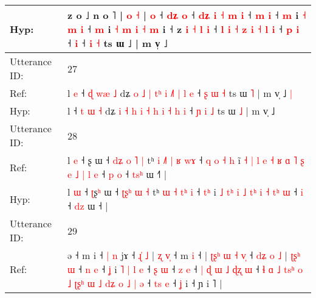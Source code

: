 \documentclass[10pt]{article}
\DeclareRobustCommand{\hl}[1]{{\textcolor{red}{#1}}}
\begin{document}
\begin{longtable}{ll}
Hyp: & z o ˩ n\hl{}\hl{}\hl{}\hl{}\hl{}\hl{}\hl{} o ˥ |\hl{}\hl{}\hl{} \hl{o} \hl{}\hl{˧} | \hl{o} ˧ \hl{d}\hl{ʑ} \hl{o} ˧ \hl{}\hl{d}\hl{ʑ} \hl{i} \hl{˧} \hl{}\hl{}\hl{m} \hl{i} ˧ \hl{m} \hl{i} ˧ \hl{m} i \hl{˧} \hl{m} \hl{}\hl{i} ˧ \hl{m} i\hl{}\hl{} \hl{˧} \hl{m} \hl{i} \hl{˧} \hl{m} i ˧ z\hl{}\hl{} \hl{i} \hl{˧} \hl{}\hl{}\hl{l} \hl{i} ˧ \hl{}\hl{l} \hl{i} \hl{}\hl{˧} \hl{z} \hl{i} \hl{˧} \hl{l} \hl{i} ˧ \hl{p} \hl{i} ˧\hl{}\hl{}\hl{}\hl{}\hl{} \hl{i} ˧\hl{}\hl{} \hl{}\hl{i} \hl{˧} ts ɯ ˩ | m v̩ ˩
 \\
\midrule
Utterance ID: & 27 \\
Ref: & l\hl{ }\hl{e} ˧ \hl{ɖ} \hl{w}\hl{æ} \hl{˩} dʑ \hl{o} \hl{˩} \hl{|} \hl{t}\hl{ʰ} \hl{i} \hl{}\hl{˩}\hl{˥} \hl{|} \hl{l} \hl{e} ˧ \hl{ʂ} \hl{ɯ} \hl{˧} ts ɯ \hl{˥} | m v̩ ˩\hl{ }\hl{|}
 \\
Hyp: & l\hl{}\hl{} ˧ \hl{t} \hl{}\hl{ɯ} \hl{˧} dʑ \hl{i} \hl{˧} \hl{h} \hl{}\hl{i} \hl{˧} \hl{h}\hl{ }\hl{i} \hl{˧} \hl{h} \hl{i} ˧ \hl{ɲ} \hl{i} \hl{˩} ts ɯ \hl{˩} | m v̩ ˩\hl{}\hl{}
 \\
\midrule
Utterance ID: & 28 \\
Ref: & l \hl{e} ˧ \hl{}ʂ\hl{} ɯ ˧ \hl{d}\hl{ʑ}\hl{ }\hl{o} \hl{˥} \hl{|} tʰ \hl{i} \hl{˩}\hl{˥} \hl{|}\hl{ }\hl{ʁ} \hl{w}\hl{ɤ} ˧\hl{ }\hl{q}\hl{ }\hl{o} \hl{˧}\hl{ }\hl{h} i\hl{̃}\hl{ }\hl{˧}\hl{ }\hl{|} \hl{l} \hl{e}\hl{ }\hl{˧} \hl{ʁ} \hl{ɑ} \hl{˥}\hl{ }\hl{ʂ} \hl{e} \hl{˩} \hl{|}\hl{ }\hl{l} \hl{e} ˧\hl{ }\hl{p} \hl{o} ˧ \hl{t}\hl{s}\hl{ʰ} ɯ ˧\hl{˥} |
 \\
Hyp: & l \hl{ɯ} ˧ \hl{ʈ}ʂ\hl{ʰ} ɯ ˧ \hl{}\hl{ʈ}\hl{ʂ}\hl{ʰ} \hl{ɯ} \hl{˧} tʰ \hl{ɯ} \hl{}\hl{˧} \hl{}\hl{t}\hl{ʰ} \hl{}\hl{i} ˧\hl{}\hl{}\hl{}\hl{} \hl{}\hl{t}\hl{ʰ} i\hl{}\hl{}\hl{}\hl{}\hl{} \hl{˩} \hl{}\hl{t}\hl{ʰ} \hl{i} \hl{˩} \hl{}\hl{t}\hl{ʰ} \hl{i} \hl{˧} \hl{}\hl{t}\hl{ʰ} \hl{ɯ} ˧\hl{}\hl{} \hl{i} ˧ \hl{}\hl{d}\hl{z} ɯ ˧\hl{} |
 \\
\midrule
Utterance ID: & 29 \\
Ref: & ə ˧ m i ˧\hl{ }\hl{|} \hl{n} jɤ ˧\hl{ }\hl{ɻ}\hl{̍}\hl{ }\hl{˩} |\hl{ }\hl{ʐ} \hl{v}\hl{̩} ˧ m \hl{i} ˧ |\hl{ }\hl{ʈ}\hl{ʂ}\hl{ʰ}\hl{ }\hl{ɯ}\hl{ }\hl{˧} \hl{v}\hl{̩} ˧\hl{ }\hl{d}\hl{ʑ}\hl{ }\hl{o}\hl{ }\hl{˩} |\hl{ }\hl{ʈ}\hl{ʂ}\hl{ʰ} \hl{ɯ} ˧ \hl{n} \hl{e} ˧ \hl{ʝ} i\hl{ }\hl{˥} \hl{|} \hl{l} \hl{e} ˧ \hl{ʂ} \hl{ɯ} ˧ \hl{z} \hl{e} ˧\hl{ }\hl{|} \hl{ɖ} \hl{ɯ} \hl{˩} \hl{ɖ}\hl{ʐ} \hl{ɯ} ˧ \hl{ɬ} \hl{ɑ} \hl{˩} \hl{t}\hl{s}\hl{ʰ} \hl{o} \hl{˩} \hl{ʈ}\hl{ʂ}\hl{ʰ} \hl{ɯ} \hl{˩} \hl{d}\hl{ʑ} \hl{o} \hl{˩} \hl{|} \hl{ə} ˧ \hl{t}\hl{s} \hl{e} ˧\hl{ }\hl{ʝ} i ˧ ɲ i ˥ |
 \\

\end{longtable}
\end{document}
